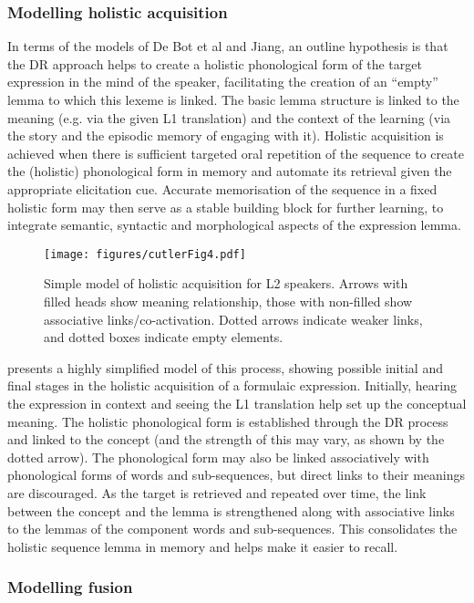 \documentclass[output=paper]{langscibook}
\begin{document}
\subsubsection{Modelling holistic acquisition}
In terms of the models of De Bot et al and Jiang, an outline hypothesis is that the DR approach helps to create a holistic phonological form of the target expression in the mind of the speaker, facilitating the creation of an ``empty'' lemma to which this lexeme is linked. The basic lemma structure is linked to the meaning (e.g. via the given L1 translation) and the context of the learning (via the story and the episodic memory of engaging with it). Holistic acquisition is achieved when there is sufficient targeted oral repetition of the sequence to create the (holistic) phonological form in memory and automate its retrieval given the appropriate elicitation cue. Accurate memorisation of the sequence in a fixed holistic form may then serve as a stable building block for further learning, to integrate semantic, syntactic and morphological aspects of the expression lemma. 

\begin{figure}
\caption{Simple model of holistic acquisition for L2 speakers. Arrows with filled heads show meaning relationship, those with non-filled show associative links\slash co-activation. Dotted arrows indicate weaker links, and dotted boxes indicate empty elements.\label{fig:cutler:4}}
\texttt{[image: figures/cutlerFig4.pdf]}
\end{figure}

 presents a highly simplified model of this process, showing possible initial and final stages in the holistic acquisition of a formulaic expression. Initially, hearing the expression in context and seeing the L1 translation help set up the conceptual meaning. The holistic phonological form is established through the DR process and linked to the concept (and the strength of this may vary, as shown by the dotted arrow). The phonological form may also be linked associatively with phonological forms of words and sub-sequences, but direct links to their meanings are discouraged. As the target is retrieved and repeated over time, the link between the concept and the lemma is strengthened along with associative links to the lemmas of the component words and sub-sequences. This consolidates the holistic sequence lemma in memory and helps make it easier to recall.

\subsubsection{Modelling fusion}
\end{document}
